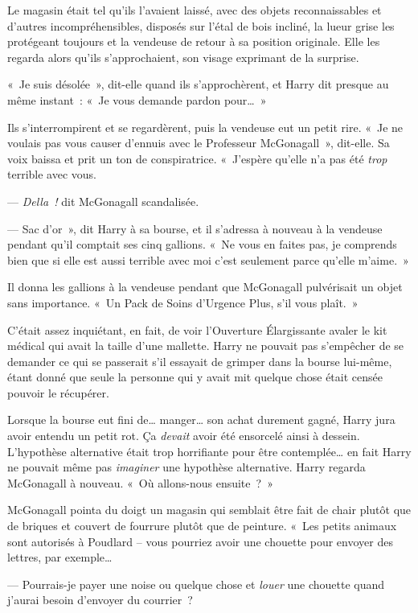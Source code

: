 \later

Le magasin était tel qu'ils l'avaient laissé, avec des objets reconnaissables et d'autres incompréhensibles, disposés sur l'étal de bois incliné, la lueur grise les protégeant toujours et la vendeuse de retour à sa position originale. Elle les regarda alors qu'ils s'approchaient, son visage exprimant de la surprise.

«~Je suis désolée~», dit-elle quand ils s'approchèrent, et Harry dit presque au même instant~: «~Je vous demande pardon pour…~»

Ils s'interrompirent et se regardèrent, puis la vendeuse eut un petit rire.
«~Je ne voulais pas vous causer d'ennuis avec le Professeur McGonagall~», dit-elle. Sa voix baissa et prit un ton de conspiratrice. «~J'espère qu'elle n'a pas été \emph{trop} terrible avec vous.

--- \emph{Della~!} dit McGonagall scandalisée.

--- Sac d'or~», dit Harry à sa bourse, et il s'adressa à nouveau à la vendeuse pendant qu'il comptait ses cinq gallions. «~Ne vous en faites pas, je comprends bien que si elle est aussi terrible avec moi c'est seulement parce qu'elle m'aime.~»

Il donna les gallions à la vendeuse pendant que McGonagall pulvérisait un objet sans importance. «~Un Pack de Soins d'Urgence Plus, s'il vous plaît.~»

C'était assez inquiétant, en fait, de voir l'Ouverture Élargissante avaler le kit médical qui avait la taille d'une mallette. Harry ne pouvait pas s'empêcher de se demander ce qui se passerait s'il essayait de grimper dans la bourse lui-même, étant donné que seule la personne qui y avait mit quelque chose était censée pouvoir le récupérer.

Lorsque la bourse eut fini de… manger… son achat durement gagné, Harry jura avoir entendu un petit rot. Ça \emph{devait} avoir été ensorcelé ainsi à dessein. L'hypothèse alternative était trop horrifiante pour être contemplée… en fait Harry ne pouvait même pas \emph{imaginer} une hypothèse alternative. Harry regarda McGonagall à nouveau. «~Où allons-nous ensuite~?~»

McGonagall pointa du doigt un magasin qui semblait être fait de chair plutôt que de briques et couvert de fourrure plutôt que de peinture.
«~Les petits animaux sont autorisés à Poudlard -- vous pourriez avoir une chouette pour envoyer des lettres, par exemple…

--- Pourrais-je payer une noise ou quelque chose et \emph{louer} une chouette quand j'aurai besoin d'envoyer du courrier~?

